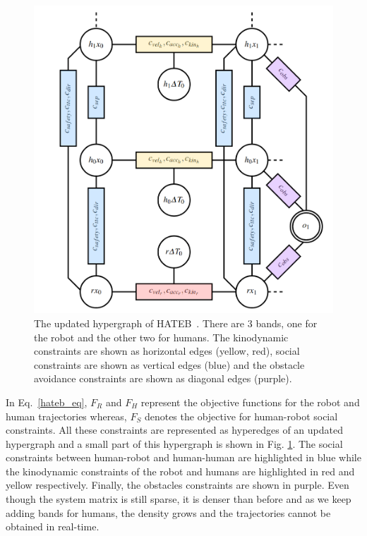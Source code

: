 \begin{figure}[!h]
    \centering
    \includegraphics[width=0.65\columnwidth]{images/hateb_new.png}
    \caption{The updated hypergraph of HATEB~\cite{khambhaita2017viewing}. There are 3 bands, one for the robot and the other two for humans. The kinodynamic constraints are shown as horizontal edges (yellow, red), social constraints are shown as vertical edges (blue) and the obstacle avoidance constraints are shown as diagonal edges (purple).}
    \label{fig:hateb_hypergraph}
\end{figure}

In Eq.~\ref{hateb_eq}, $F_R$ and $F_H$ represent the objective functions for the robot and human trajectories whereas, $F_S$ denotes the objective for human-robot social constraints. All these constraints are represented as hyperedges of an updated hypergraph and a small part of this hypergraph is shown in Fig. \ref{fig:hateb_hypergraph}. The social constraints between human-robot and human-human are highlighted in blue while the kinodynamic constraints of the robot and humans are highlighted in red and yellow respectively. Finally, the obstacles constraints are shown in purple. Even though the system matrix is still sparse, it is denser than before and as we keep adding bands for humans, the density grows and the trajectories cannot be obtained in real-time. 

\newpage
